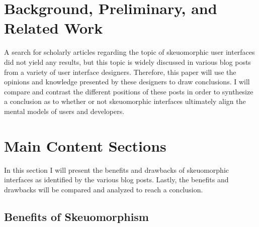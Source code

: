 \documentclass{article}
\begin{document}
\section{Background, Preliminary, and Related Work}

	A search for scholarly articles regarding the topic of skeuomorphic user interfaces did not yield any results, but this topic is widely discussed in various blog posts from a variety of user interface designers. Therefore, this paper will use the opinions and knowledge presented by these designers to draw conclusions. I will compare and contrast the different positions of these posts in order to synthesize a conclusion as to whether or not skeuomorphic interfaces ultimately align the mental models of users and developers.

\section{Main Content Sections}
	In this section I will present the benefits and drawbacks of skeuomorphic interfaces as identified by the various blog posts. Lastly, the benefits and drawbacks will be compared and analyzed to reach a conclusion. 

\subsection{Benefits of Skeuomorphism}
\end{document}
